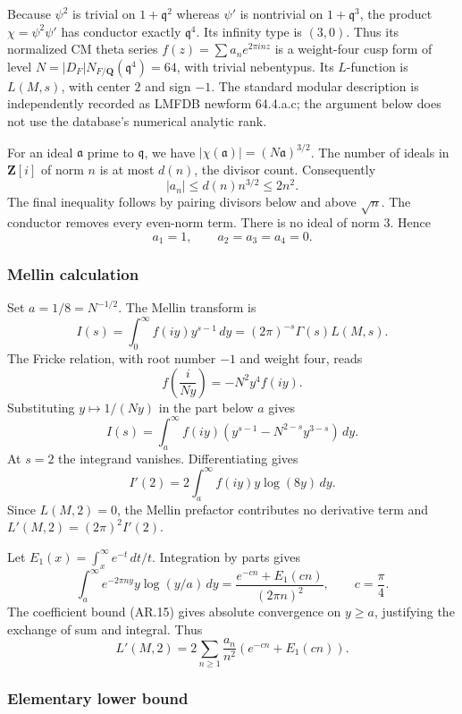 \documentclass[11pt,a4paper]{article}
\begin{document}
Because \(\psi^2\) is trivial on \(1+\mathfrak q^2\) whereas \(\psi'\)
is nontrivial on \(1+\mathfrak q^3\), the product \(\chi=\psi^2\psi'\)
has conductor exactly \(\mathfrak q^4\). Its infinity type is \((3,0)\).
Thus its normalized CM theta series \(f(z)=\sum a_n e^{2\pi i nz}\) is a
weight-four cusp form of level
\(N=|D_F|N_{F/\mathbf Q}(\mathfrak q^4)=64\), with trivial nebentypus.
Its \(L\)-function is \(L(M,s)\), with center \(2\) and sign \(-1\). The
standard modular description is independently recorded as LMFDB newform
64.4.a.c; the argument below does not use the database's numerical
analytic rank.

For an ideal \(\mathfrak a\) prime to \(\mathfrak q\), we have
\(|\chi(\mathfrak a)|=(N\mathfrak a)^{3/2}\). The number of ideals in
\(\mathbf Z[i]\) of norm \(n\) is at most \(d(n)\), the divisor count.
Consequently \[
|a_n|\le d(n)n^{3/2}\le2n^2.
\tag{AR.15}
\] The final inequality follows by pairing divisors below and above
\(\sqrt n\). The conductor removes every even-norm term. There is no
ideal of norm \(3\). Hence \[
a_1=1,\qquad a_2=a_3=a_4=0.
\tag{AR.16}
\]

\subsubsection{Mellin calculation}\label{mellin-calculation}

Set \(a=1/8=N^{-1/2}\). The Mellin transform is \[
I(s)=\int_0^\infty f(iy)y^{s-1}\,dy
     =(2\pi)^{-s}\Gamma(s)L(M,s).
\] The Fricke relation, with root number \(-1\) and weight four, reads
\[
f\!\left(\frac{i}{Ny}\right)=-N^2y^4 f(iy).
\] Substituting \(y\mapsto1/(Ny)\) in the part below \(a\) gives \[
I(s)=\int_a^\infty f(iy)
 \left(y^{s-1}-N^{2-s}y^{3-s}\right)\,dy.
\] At \(s=2\) the integrand vanishes. Differentiating gives \[
I'(2)=2\int_a^\infty f(iy)y\log(8y)\,dy.
\] Since \(L(M,2)=0\), the Mellin prefactor contributes no derivative
term and \(L'(M,2)=(2\pi)^2I'(2)\).

Let \(E_1(x)=\int_x^\infty e^{-t}\,dt/t\). Integration by parts gives \[
\int_a^\infty e^{-2\pi ny}y\log(y/a)\,dy
 =\frac{e^{-cn}+E_1(cn)}{(2\pi n)^2},
\qquad c=\frac\pi4.
\] The coefficient bound (AR.15) gives absolute convergence on
\(y\ge a\), justifying the exchange of sum and integral. Thus \[
L'(M,2)
 =2\sum_{n\ge1}\frac{a_n}{n^2}
       \left(e^{-cn}+E_1(cn)\right).
\tag{AR.17}
\]

\subsubsection{Elementary lower bound}\label{elementary-lower-bound}
\end{document}
